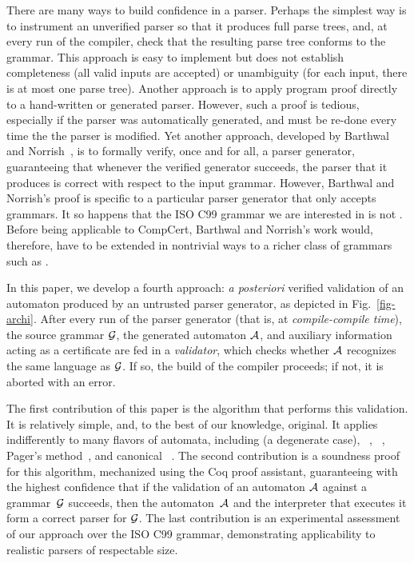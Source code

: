 \documentclass{llncs}
\begin{document}
There are many ways to build confidence in a parser.  Perhaps the
simplest way is to instrument an unverified parser so that it produces
full parse trees, and, at every run of the compiler, check that the
resulting parse tree conforms to the grammar.  This approach is easy
to implement but does not establish
completeness (all valid inputs are accepted)
or unambiguity (for each input, there is at most one parse tree).
Another approach is to apply program proof directly
to a hand-written or generated parser.  However, such a proof is
tedious, especially if the parser was automatically generated,
and must be re-done every time the the parser is
modified. Yet another approach, developed by Barthwal and
Norrish~\cite{barthwal-norrish-09,Barthwal-phd}, is to formally verify, once and
for all, a parser generator, guaranteeing that whenever the verified
generator succeeds, the parser that it produces is correct with respect to
the input grammar.  However, Barthwal and Norrish's proof is specific
to a particular parser generator that only accepts \slr grammars.  It
so happens that the ISO C99 grammar we are interested in is not \slr.
Before being applicable to CompCert, Barthwal and Norrish's work
would, therefore, have to be extended in nontrivial ways to a richer
class of grammars such as \lalr.

In this paper, we develop a fourth approach: {\em a posteriori}
verified validation of an \lrone automaton produced by an untrusted
parser generator, as depicted in Fig.~\ref{fig-archi}. After every run
of the parser generator (that is, at {\em compile-compile time\/}),
the source grammar $\mathcal{G}$, the generated automaton $\mathcal{A}$,
and auxiliary information acting as a certificate are fed in a {\em
validator}, which checks whether $\mathcal{A}$ recognizes the same
language as $\mathcal{G}$.  If so, the build of the compiler proceeds; if
not, it is aborted with an error.

The first contribution of this paper is the algorithm that performs
this validation. It is relatively simple, and, to the best of
our knowledge, original. It applies indifferently to many flavors of \lrone
automata, including \lrzero (a degenerate
case), \slr~\cite{deremer-slr-71}, \lalr~\cite{anderson-eve-horning-73},
Pager's method~\citeyear{pager-77}, and canonical \lrone~\cite{knuth-lr-65}.
The second contribution is a soundness proof for this algorithm,
mechanized using the Coq proof assistant, guaranteeing with the
highest confidence that if the validation of an automaton $\mathcal{A}$ against
a grammar~$\mathcal{G}$ succeeds, then the automaton~$\mathcal{A}$ and the interpreter
that executes it form a correct parser for $\mathcal{G}$. The last
contribution is an experimental assessment of our approach over the
ISO C99 grammar, demonstrating applicability to realistic parsers of
respectable size.
\end{document}

